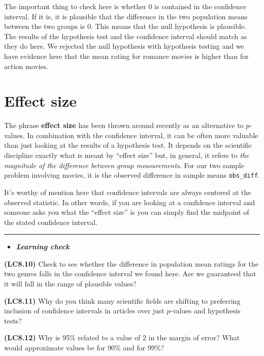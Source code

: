 \documentclass[]{tufte-book}
\let\oldrule=\rule
\renewcommand{\rule}[1]{\oldrule{\linewidth}}
\newenvironment{rmdblock}[1]
  {\begin{shaded*}
  \begin{itemize}
  \renewcommand{\labelitemi}{
    \raisebox{-.7\height}[0pt][0pt]{
    }
  }
  \item
  }
  {
  \end{itemize}
  \end{shaded*}
  }
\newenvironment{learncheck}
  {\begin{rmdblock}{warning}}
  {\end{rmdblock}}
\theoremstyle{definition}
\theoremstyle{definition}
\theoremstyle{remark}
\begin{document}
The important thing to check here is whether 0 is contained in the
confidence interval. If it is, it is plausible that the difference in
the two population means between the two groups is 0. This means that
the null hypothesis is plausible. The results of the hypothesis test and
the confidence interval should match as they do here. We rejected the
null hypothesis with hypothesis testing and we have evidence here that
the mean rating for romance movies is higher than for action movies.

\section{Effect size}\label{effect-size}

The phrase \textbf{effect size} has been thrown around recently as an
alternative to \(p\)-values. In combination with the confidence
interval, it can be often more valuable than just looking at the results
of a hypothesis test. It depends on the scientific discipline exactly
what is meant by ``effect size'' but, in general, it refers to \emph{the
magnitude of the difference between group measurements}. For our two
sample problem involving movies, it is the observed difference in sample
means \texttt{obs\_diff}.

It's worthy of mention here that confidence intervals are always
centered at the observed statistic. In other words, if you are looking
at a confidence interval and someone asks you what the ``effect size''
is you can simply find the midpoint of the stated confidence interval.

\begin{center}\rule{0.5\linewidth}{\linethickness}\end{center}

\begin{learncheck}
\textbf{\emph{Learning check}}
\end{learncheck}

\textbf{(LC8.10)} Check to see whether the difference in population mean
ratings for the two genres falls in the confidence interval we found
here. Are we guaranteed that it will fall in the range of plausible
values?

\textbf{(LC8.11)} Why do you think many scientific fields are shifting
to preferring inclusion of confidence intervals in articles over just
\(p\)-values and hypothesis tests?

\textbf{(LC8.12)} Why is 95\% related to a value of 2 in the margin of
error? What would approximate values be for 90\% and for 99\%?
\end{document}
